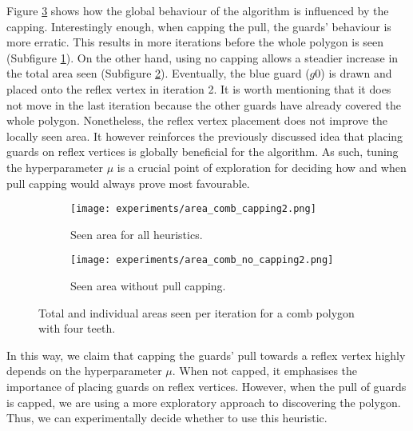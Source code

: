 \newpage
Figure \ref{fig:no_cap_plots} shows how the global behaviour of the algorithm is influenced by the capping. Interestingly enough, when capping the pull, the guards' behaviour is more erratic. This results in more iterations before the whole polygon is seen (Subfigure \ref{fig:area_all_cap}).  On the other hand, using no capping allows a steadier increase in the total area seen (Subfigure \ref{fig:area_no_cap}). Eventually, the blue guard ($g0$) is drawn and placed onto the reflex vertex in iteration 2. It is worth mentioning that it does not move in the last iteration because the other guards have already covered the whole polygon. Nonetheless, the reflex vertex placement does not improve the locally seen area. It however reinforces the previously discussed idea that placing guards on reflex vertices is globally beneficial for the algorithm. As such, tuning the hyperparameter $\mu$ is a crucial point of exploration for deciding how and when pull capping would always prove most favourable.

\begin{figure}[!h]
    \begin{subfigure}{0.45\textwidth}
        \texttt{[image: experiments/area\_comb\_capping2.png]}
        \caption{Seen area for all heuristics.}
        \label{fig:area_all_cap}
    \end{subfigure}
    \hfill
    \begin{subfigure}{0.45\textwidth}
        \texttt{[image: experiments/area\_comb\_no\_capping2.png]}
        \caption{Seen area without pull capping.}
        \label{fig:area_no_cap}
    \end{subfigure}
    \caption{Total and individual areas seen per iteration for a comb polygon with four teeth.}
    \label{fig:no_cap_plots}
\end{figure}

In this way, we claim that capping the guards' pull towards a reflex vertex highly depends on the hyperparameter $\mu$. When not capped, it emphasises the importance of placing guards on reflex vertices. However, when the pull of guards is capped, we are using a more exploratory approach to discovering the polygon. Thus, we can experimentally decide whether to use this heuristic. 

\newpage

